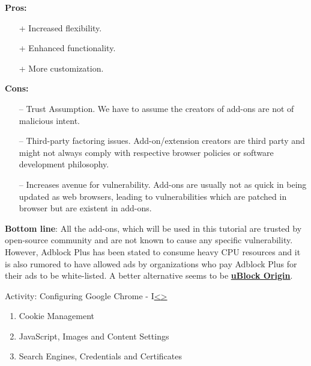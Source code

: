 \documentclass[12pt]{extarticle}
\newenvironment{instructionblock}{\Large\bgroup}{\egroup}
\begin{document}
	\noindent
	\textbf{Pros:}
	\begin{itemize}
		\item[+] Increased flexibility.
		\item[+] Enhanced functionality.
		\item[+] More customization.
	\end{itemize}
	
	\noindent
	\textbf{Cons:}
	\begin{itemize}
		\item[--] Trust Assumption. We have to assume the creators of add-ons are not of malicious intent.
		\item[--] Third-party factoring issues. Add-on/extension creators are third party and might not always comply with respective browser policies or software development philosophy.
		\item[--] Increases avenue for vulnerability. Add-ons are usually not as quick in being updated as web browsers, leading to vulnerabilities which are patched in browser but are existent in add-ons.
	\end{itemize}
	
	\vspace{2mm}
	\noindent
	\textbf{Bottom line}: All the add-ons, which will be used in this tutorial are trusted by open-source community and are not known to cause any specific vulnerability. However, Adblock Plus has been stated to consume heavy CPU resources and it is also rumored to have allowed ads by organizations who pay Adblock Plus for their ads to be white-listed\cite{Adblock}\cite{ABP}. A better alternative seems to be \href{https://addons.mozilla.org/en-us/firefox/addon/ublock-origin/}{\textbf{\underline{uBlock Origin}}}\cite{Blocking}. 


	
	\pagebreak
	\begin{slide}{Activity: Configuring Google Chrome - I}{\hyperref[slide 9]{\textless}\hyperref[slide 11]{\textgreater}}
		\begin{instructionblock}
			\begin{enumerate}
				\item Cookie Management
				\item JavaScript, Images and Content Settings
				\item Search Engines, Credentials and Certificates
			\end{enumerate}
		\end{instructionblock}
	\end{slide}
	\vfill
	
\end{document}
